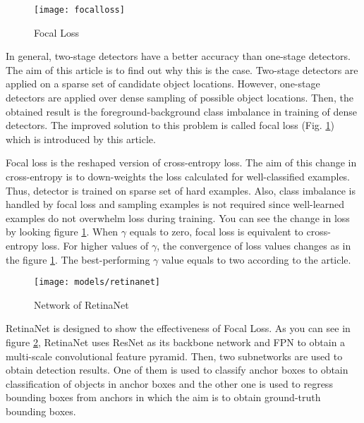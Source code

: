 \documentclass{article}
\begin{document}
\setlength{\parindent}{6ex}

\begin{figure}
    \centering
    \texttt{[image: focalloss]}
    \caption{Focal Loss}
    \label{fig:focalloss1}
\end{figure}

\indent

In general, two-stage detectors have a better accuracy than one-stage 
detectors. The aim of this article is to find out why this is the case. 
Two-stage detectors are applied on a sparse set of candidate object 
locations. However, one-stage detectors are applied over dense sampling 
of possible object locations. Then, the obtained result is the 
foreground-background class imbalance in training of dense detectors.
The improved solution to this problem is called focal loss (Fig. 
\ref{fig:focalloss1}) which is introduced by this article. \par

Focal loss \cite{flretnetcite} is the reshaped version of cross-entropy loss. The aim of 
this change in cross-entropy is to down-weights the loss calculated for 
well-classified examples. Thus, detector is trained on sparse set of 
hard examples. Also, class imbalance is handled by focal loss and 
sampling examples is not required since well-learned examples do not 
overwhelm loss during training. You can see the change in loss by looking 
figure \ref{fig:focalloss1}. When $\gamma$ equals to zero, focal loss is 
equivalent to cross-entropy loss. For higher values of $\gamma$, the 
convergence of loss values changes as in the figure \ref{fig:focalloss1}. 
The best-performing $\gamma$ value equals to two according to the article.

\begin{figure}
    \centering
    \texttt{[image: models/retinanet]}
    \caption{Network of RetinaNet}
    \label{fig:retinanet1}
\end{figure}
\indent

RetinaNet \cite{flretnetcite} is designed to show the effectiveness of Focal Loss. As you 
can see in figure \ref{fig:retinanet1}, RetinaNet uses ResNet as its 
backbone network and FPN to obtain a multi-scale convolutional feature 
pyramid. Then, two subnetworks are used to obtain detection results. 
One of them is used to classify anchor boxes to obtain classification of 
objects in anchor boxes and the other one is used to regress bounding 
boxes from anchors in which the aim is to obtain ground-truth bounding 
boxes.
\end{document}
